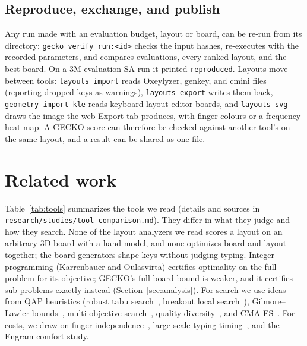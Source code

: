 \documentclass{gecko-paper}
\begin{document}
\begin{paperbody}
\subsection{Reproduce, exchange, and publish}
Any run made with an evaluation budget, layout or board, can be re-run from its directory: \texttt{gecko verify run:<id>} checks the input hashes, re-executes with the recorded parameters, and compares evaluations, every ranked layout, and the best board. On a 3M-evaluation SA run it printed \texttt{reproduced}. Layouts move between tools: \texttt{layouts import} reads Oxeylyzer, genkey, and cmini files (reporting dropped keys as warnings), \texttt{layouts export} writes them back, \texttt{geometry import-kle} reads keyboard-layout-editor boards, and \texttt{layouts svg} draws the image the web Export tab produces, with finger colours or a frequency heat map. A GECKO score can therefore be checked against another tool's on the same layout, and a result can be shared as one file.

\section{Related work}\label{sec:related}
Table~\ref{tab:tools} summarizes the tools we read (details and sources in \texttt{research/studies/tool-comparison.md}). They differ in what they judge and how they search. None of the layout analyzers we read scores a layout on an arbitrary 3D board with a hand model, and none optimizes board and layout together; the board generators shape keys without judging typing. Integer programming (Karrenbauer and Oulasvirta) certifies optimality on the full problem for its objective; GECKO's full-board bound is weaker, and it certifies sub-problems exactly instead (Section~\ref{sec:analysis}). For search we use ideas from QAP heuristics (robust tabu search~, breakout local search~), Gilmore–Lawler bounds~, multi-objective search~, quality diversity~, and CMA-ES~. For costs, we draw on finger independence~, large-scale typing timing~, and the Engram comfort study.


\end{paperbody}
\end{document}
